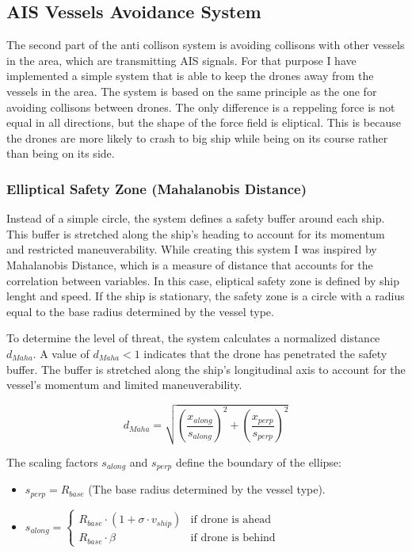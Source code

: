 \subsection{AIS Vessels Avoidance System}

    The second part of the anti collison system is avoiding collisons with other vessels in the area, which are transmitting AIS signals. For that purpose I have implemented a simple system that is able to keep the drones away from the vessels in the area. The system is based on the same principle as the one for avoiding collisons between drones. The only difference is a reppeling force is not equal in all directions, but the shape of the force field is eliptical. This is because the drones are more likely to crash to big ship while being on its course rather than being on its side. 





\vspace{1cm}
\subsubsection{Elliptical Safety Zone (Mahalanobis Distance)}
Instead of a simple circle, the system defines a safety buffer around each ship. This buffer is stretched along the ship's heading to account for its momentum and restricted maneuverability. While creating this system I was inspired by Mahalanobis Distance, which is a measure of distance that accounts for the correlation between variables. In this case, eliptical safety zone is defined by ship lenght and speed. If the ship is stationary, the safety zone is a circle with a radius equal to the base radius determined by the vessel type. 


To determine the level of threat, the system calculates a normalized distance $d_{Maha}$. A value of $d_{Maha} < 1$ indicates that the drone has penetrated the safety buffer. The buffer is stretched along the ship's longitudinal axis to account for the vessel's momentum and limited maneuverability.

\begin{equation}
    d_{Maha} = \sqrt{ \left( \frac{x_{along}}{s_{along}} \right)^2 + \left( \frac{x_{perp}}{s_{perp}} \right)^2 }
\end{equation}

The scaling factors $s_{along}$ and $s_{perp}$ define the boundary of the ellipse:

\begin{itemize}
    \item $s_{perp} = R_{base}$ (The base radius determined by the vessel type).\item $s_{along} = 
    \begin{cases} R_{base} \cdot (1 + \sigma \cdot v_{ship}) & \text{if drone is ahead} \\ R_{base} \cdot \beta & \text{if drone is behind} \end{cases}$
\end{itemize}

